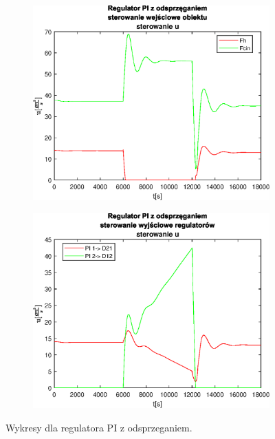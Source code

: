 \begin{figure}[h!]
   \begin{subfigure}[b]{0.4\textwidth}
      \includegraphics[width=1\linewidth]{img/PI/decoupler/noDisturbance/PIDecouplerControl1Lintrue.eps}
      \caption{}
      \label{fig:fig:PIDecoupler1Lintrue3}
   \end{subfigure}
       
   \begin{subfigure}[b]{0.4\textwidth}
      \includegraphics[width=1\linewidth]{img/PI/decoupler/noDisturbance/PIDecouplerControlD1Lintrue.eps}
      \caption{}
      \label{fig:fig:PIDecoupler1Lintrue4}
   \end{subfigure}
       
   \caption{Wykresy dla regulatora PI z odsprzeganiem.}
   \label{fig:PIDecoupler1Lintrue}
\end{figure}
           
